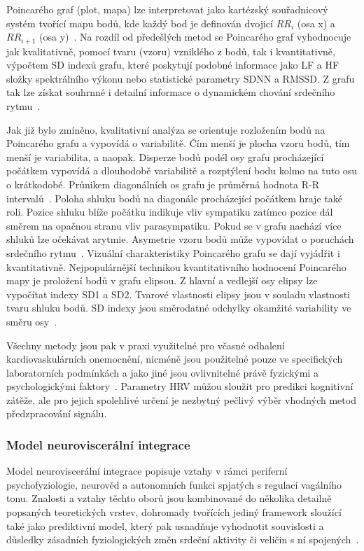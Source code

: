 Poincarého graf (plot, mapa) lze interpretovat jako kartézský souřadnicový systém
tvořící mapu bodů, kde každý bod je definován dvojicí $RR_i$ (osa x) a
$RR_{i+1}$ (osa y)~\cite{Hsu2012,Hejjel2001}. Na rozdíl od předešlých metod se
Poincarého graf vyhodnocuje jak kvalitativně, pomocí tvaru (vzoru) vzniklého z
bodů, tak i kvantitativně, výpočtem SD indexů grafu, které poskytují podobné
informace jako LF a HF složky spektrálního výkonu nebo statistické parametry
SDNN a RMSSD. Z grafu tak lze získat souhrnné i detailní informace o dynamickém
chování srdečního rytmu~\cite{Hsu2012,Kubickova2016}. 

Jak již bylo zmíněno, kvalitativní analýza se orientuje rozložením bodů na
Poincarého grafu a vypovídá o variabilitě. Čím menší je plocha vzoru bodů, tím
menší je variabilita, a naopak. Disperze bodů podél osy grafu procházející
počátkem vypovídá a dlouhodobě variabilitě a rozptýlení bodu kolmo na tuto osu o
krátkodobé. Průnikem diagonálních os grafu je průměrná hodnota R-R
intervalů~\cite{Hejjel2001}. Poloha shluku bodů na diagonále procházející
počátkem hraje také roli. Pozice shluku blíže počátku indikuje vliv sympatiku
zatímco pozice dál směrem na opačnou stranu vliv parasympatiku. Pokud se v grafu
nachází více shluků lze očekávat arytmie. Asymetrie vzoru bodů může vypovídat o
poruchách srdečního rytmu~\cite{Habib2013}. Vizuální charakteristiky Poincarého
grafu se dají vyjádřit i kvantitativně. Nejpopulárnější technikou
kvantitativního hodnocení Poincarého mapy je proložení bodů v grafu elipsou.
Z hlavní a vedlejší osy elipsy lze vypočítat indexy SD1 a SD2. Tvarové
vlastnosti elipsy jsou v souladu vlastnosti tvaru shluku bodů.
SD indexy jsou směrodatné odchylky okamžité variability ve směru
osy~\cite{Habib2013,Mazhar2007}.

Všechny metody jsou pak v praxi využitelné pro včasné odhalení
kardiovaskulárních onemocnění, nicméně jsou použitelné pouze ve specifických
laboratorních podmínkách a jako jiné jsou ovlivnitelné právě fyzickými a
psychologickými faktory~\cite{Habib2013,Kubickova2016}. Parametry HRV můžou
sloužit pro predikci kognitivní zátěže, ale pro jejich spolehlivé určení je
nezbytný pečlivý výběr vhodných metod předzpracování signálu.

\subsubsection{Model neuroviscerální integrace}
Model neuroviscerální integrace popisuje vztahy v rámci periferní
psychofyziologie, neurověd a autonomních funkci spjatých s regulací vagálního
tonu. Znalosti a vztahy těchto oborů jsou kombinované do několika detailně popsaných
teoretických vrstev, dohromady tvořících jediný framework sloužící také jako
prediktivní model, který pak usnadňuje vyhodnotit souvislosti a důsledky
zásadních fyziologických změn srdeční aktivity či veličin s ní
spojených~\cite{Smith2017}.

